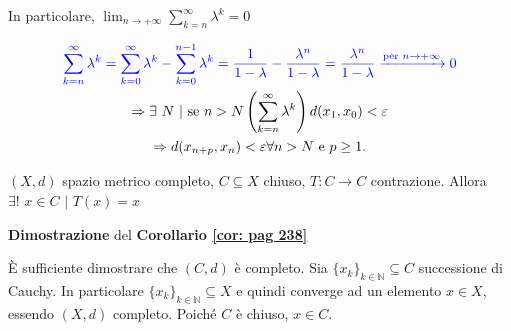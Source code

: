 \begin{dembar}
 	In particolare, $\lim_{n\rightarrow +\infty} \sum_{k=n}^{\infty}\lambda^k=0$
 	
 	\begin{gather*} 
 		{\color{blue} \sum_{k=n}^{\infty} \lambda^k = \sum_{k=0}^{\infty} \lambda^k - \sum_{k=0}^{n-1} \lambda^k = \frac{1}{1-\lambda} - \frac{\-\lambda^n}{1-\lambda} = \frac{\lambda^n}{1-\lambda} \xrightarrow{\text{per } n \to +\infty} 0}
 		\\
 	 	\Rightarrow \exists\,\, N \,\, | \text{ se } n> N\left(\sum_{k=n}^{\infty}\lambda^k\right)d(x_1,x_0)<\epsilon
 	 	\\
 	 	\Rightarrow d(x_{n+p},x_n)<\epsilon \forall n > N \text{ e } p \geq 1.
 	 \end{gather*}
\end{dembar}


\begin{corollary}
	\label{cor: pag 238}
	$(X,d)$ spazio metrico completo, $C\subseteq X$ chiuso, $T: C \rightarrow C$ contrazione. Allora $\exists!\,\, x \in C \,\, | \,\, T(x)=x$
\end{corollary}


\begin{dembar}
	\textbf{Dimostrazione} del \textbf{Corollario \ref{cor: pag 238}}
	
	È sufficiente dimostrare che $(C,d)$ è completo. Sia $\{x_k\}_{k \in \mathbb{N}}\subseteq C$ successione di Cauchy. In particolare $\{x_k\}_{k \in \mathbb{N}} \subseteq X $ e quindi converge ad un elemento $x \in X$, essendo $(X,d)$ completo. Poiché $C$ è chiuso, $x \in C$.
\end{dembar}


